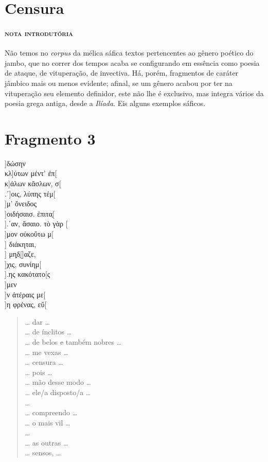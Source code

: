 \section{Censura}

\paragraph{\textsc{nota introdutória}}
Não temos no \textit{corpus }da mélica sáfica textos pertencentes ao gênero
poético do jambo, que no correr dos tempos acaba se configurando em essência como poesia de
ataque, de vituperação, de invectiva. Há, porém,
fragmentos de caráter jâmbico mais ou menos evidente; afinal, se um gênero
acabou por ter na vituperação seu elemento definidor, este não lhe é exclusivo,
mas integra vários da poesia grega antiga, desde a \textit{Ilíada}. Eis
alguns exemplos sáficos.

\section{Fragmento 3} 

\begin{gkverse}
]δώσην\\
κλ]ύτων μέντ’ ἐπ[\\
κ]άλων κἄσλων, σ[\\
.΄]οις, λύπης τέμ[\\
 ]μ’ ὄνειδος\\
]οιδήσαισ. ἐπιτα̣[\\
].΄αν, ἄσαιο. τὸ γὰρ [\\
]μον οὐκοὔτω μ[\\
] διάκηται,\\
  ] μη̣δ̣[\qquad    ]αζε,\\
  ]χις, συνίημ[\\ 
].ης κακότατο[ς\\
  ]μεν\\
  ]ν ἀτέραις με[\\
]η φρένας, εὔ[
\end{gkverse}
\pagebreak
\begin{verse}
\ldots{} dar \ldots{}\\
\ldots{} de ínclitos \ldots{}\\
\ldots{} de belos e também nobres \ldots{}\\
\ldots{} me vexas \ldots{}\\
\ldots{} censura \ldots{}\\
\ldots{} pois \ldots{}\\
\ldots{} mão desse modo \ldots{}\\
\ldots{} ele/a disposto/a \ldots{}\\
\ldots{}\\
\ldots{} compreendo \ldots{}\\
\ldots{} o mais vil \ldots{}\\
\ldots{}\\
\ldots{} as outras \ldots{}\\
\ldots{} sensos, \ldots{}
\end{verse}


